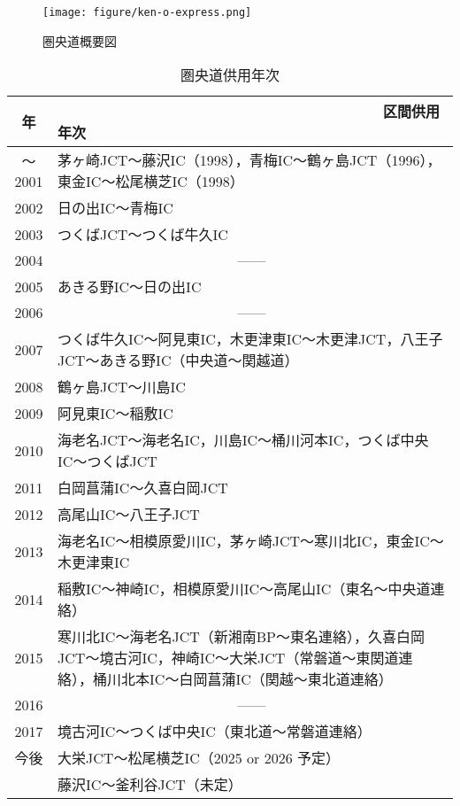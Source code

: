 \begin{figure}[H]
  \centering
  \texttt{[image: figure/ken-o-express.png]}
  \caption{圏央道概要図}
  \label{fig:ken-o-express}
\end{figure}
\newpage
\begin{table}[h]
  \begin{center}
    \caption{圏央道供用年次}
    \vspace{1.5zw}
    \begin{tabular}{|c|p{12cm}|}\hline \label{圏央道供用年次}
      年 & ~~~~~~~~~~~~~~~~~~~~~~~~~~~~~~~~~~~~~~~~区間供用年次 \\ \hline \hline
      〜2001 & 茅ヶ崎JCT〜藤沢IC（1998），青梅IC〜鶴ヶ島JCT（1996），東金IC〜松尾横芝IC（1998） \\ \hline
      2002 & 日の出IC〜青梅IC \\ \hline
      2003 & つくばJCT〜つくば牛久IC \\ \hline
      2004 & \multicolumn{1}{|c|}{------} \\ \hline
      2005 & あきる野IC〜日の出IC \\ \hline
      2006 & \multicolumn{1}{|c|}{------} \\ \hline
      2007 & つくば牛久IC〜阿見東IC，木更津東IC〜木更津JCT，八王子JCT〜あきる野IC（中央道〜関越道） \\ \hline
      2008 & 鶴ヶ島JCT〜川島IC \\ \hline
      2009 & 阿見東IC〜稲敷IC \\ \hline
      2010 & 海老名JCT〜海老名IC，川島IC〜桶川河本IC，つくば中央IC〜つくばJCT \\ \hline
      2011 & 白岡菖蒲IC〜久喜白岡JCT \\ \hline
      2012 & 高尾山IC〜八王子JCT \\ \hline
      2013 & 海老名IC〜相模原愛川IC，茅ヶ崎JCT〜寒川北IC，東金IC〜木更津東IC \\ \hline
      2014 & 稲敷IC〜神崎IC，相模原愛川IC〜高尾山IC（東名〜中央道連絡） \\ \hline
      2015 & 寒川北IC〜海老名JCT（新湘南BP〜東名連絡），久喜白岡JCT〜境古河IC，神崎IC〜大栄JCT（常磐道〜東関道連絡），桶川北本IC〜白岡菖蒲IC（関越〜東北道連絡） \\ \hline
      2016 & \multicolumn{1}{|c|}{------} \\ \hline
      2017 & 境古河IC〜つくば中央IC（東北道〜常磐道連絡） \\ \hline
      今後 & 大栄JCT〜松尾横芝IC（2025 or 2026 予定）\\ \hline
      & 藤沢IC〜釜利谷JCT（未定） \\ \hline
    \end{tabular}
  \end{center}
\end{table}


